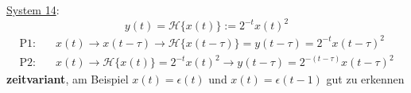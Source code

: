 \documentclass[11pt,a4paper,DIV=12]{scrartcl}
\numberwithin{equation}{section}
\numberwithin{figure}{section}
\newcommand{\sysH}[1]{\mathcal{H}{\{#1\}}}
\begin{document}
\begin{Loesung}
\item  \underline{System 14}:
\begin{equation}
y(t) = \sysH{x(t)}:= 2^{-t} x(t)^2
\end{equation}
\begin{align}
\text{P1:}& \quad x(t)\rightarrow x(t-\tau)\rightarrow \mathcal{H}\{x(t-\tau)\}=y(t-\tau)=2^{-t} x(t-\tau)^2\\
\text{P2:}& \quad x(t)\rightarrow \mathcal{H}\{x(t)\}=2^{-t} x(t)^2\rightarrow y(t-\tau)=2^{-(t-\tau)} x(t-\tau)^2
\end{align}
\textbf{zeitvariant}, am Beispiel $x(t)=\epsilon(t)$ und $x(t)=\epsilon(t-1)$
gut zu erkennen
\end{Loesung}















\newpage
\end{document}
